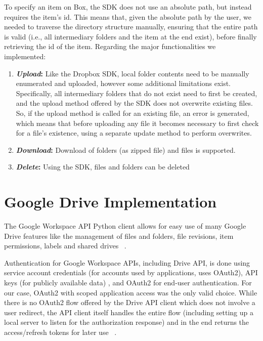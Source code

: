To specify an item on Box, the SDK does not use an absolute path, but instead requires the item's id. This means that, given the absolute path by the user, we needed to traverse the directory structure manually, ensuring that the entire path is valid (i.e., all intermediary folders and the item at the end exist), before finally retrieving the id of the item. Regarding the major functionalities we implemented: ~\cite{box_docs}


\begin{enumerate}
    \item \textbf{\textit{Upload}:} Like the Dropbox SDK, local folder contents need to be manually enumerated and uploaded, however some additional limitations exist. Specifically, all intermediary folders that do not exist need to first be created, and the upload method offered by the SDK does not overwrite existing files. So, if the upload method is called for an existing file, an error is generated, which means that before uploading any file it becomes necessary to first check for a file's existence, using a separate update method to perform overwrites.

    \item \textbf{\textit{Download}:} Download of folders (as zipped file) and files is supported.

    \item \textbf{\textit{Delete}:} Using the SDK, files and folders can be deleted
\end{enumerate}


\section{Google Drive Implementation}
The Google Workspace API Python client allows for easy use of many Google Drive features like the management of files and folders, file revisions, item permissions, labels and shared drives ~\cite{drive_docs}. 

Authentication for Google Workspace APIs, including Drive API, is done using service account credentials (for accounts used by applications, uses OAuth2), API keys (for publicly available data) , and OAuth2 for end-user authentication. For our case, OAuth2 with scoped application access was the only valid choice. While there is no OAuth2 flow offered by the Drive API client which does not involve a user redirect, the API client itself handles the entire flow (including setting up a local server to listen for the authorization response) and in the end returns the access/refresh tokens for later use ~\cite{drive_auth}.  

